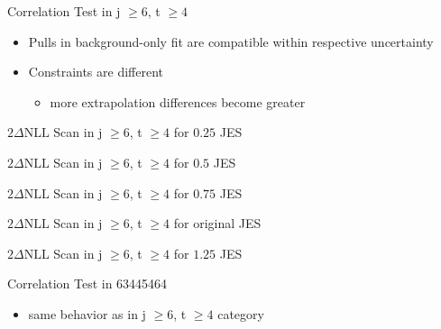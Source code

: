 \begin{frame}{Correlation Test in j $\geq 6$, t $\geq 4$}

\begin{itemize}
\item Pulls in background-only fit are compatible within respective uncertainty\\
\item Constraints are different
\begin{itemize}
\item more extrapolation \rar differences become greater

\end{itemize}
\end{itemize}
\end{frame}

\begin{frame}{$2\Delta \text{NLL}$ Scan in j $\geq 6$, t $\geq 4$ for $\num[round-precision=2]{0.25}$ JES}
\end{frame}

\begin{frame}{$2\Delta \text{NLL}$ Scan in j $\geq 6$, t $\geq 4$ for $\num[round-precision=2]{0.5}$ JES}
\end{frame}

\begin{frame}{$2\Delta \text{NLL}$ Scan in j $\geq 6$, t $\geq 4$ for $\num[round-precision=2]{0.75}$ JES}
\end{frame}

\begin{frame}{$2\Delta \text{NLL}$ Scan in j $\geq 6$, t $\geq 4$ for original JES}
\end{frame}

\begin{frame}{$2\Delta \text{NLL}$ Scan in j $\geq 6$, t $\geq 4$ for $\num[round-precision=2]{1.25}$ JES}
\end{frame}


\begin{frame}{Correlation Test in 63445464}

\begin{itemize}
\item same behavior as in j $\geq 6$, t $\geq 4$ category
\end{itemize}
\end{frame}



